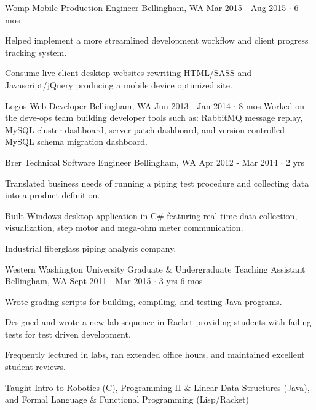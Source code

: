 \documentclass[11pt, a4paper]{awesome-cv}
\begin{document}
\begin{cventries}
  \cventry
    {Womp Mobile} %
    {Production Engineer} %
    {Bellingham, WA} %
    {Mar 2015 - Aug 2015  $\cdot$ 6 mos} %
    {
      \begin{cvitems} %
        \item Helped implement a more streamlined development workflow and client progress tracking system.
      \end{cvitems}
    }
    {Consume live client desktop websites rewriting HTML/SASS and Javascript/jQuery producing a mobile device optimized site.}

  \cventry
    {Logos} %
    {Web Developer} %
    {Bellingham, WA} %
    {Jun 2013 - Jan 2014  $\cdot$ 8 mos} %
    {
    }
    {Worked on the deve-ops team building developer tools such as: RabbitMQ message replay, MySQL cluster dashboard, server patch dashboard, and version controlled MySQL schema migration dashboard.}

  \cventry
    {Brer Technical} %
    {Software Engineer} %
    {Bellingham, WA} %
    {Apr 2012 - Mar 2014  $\cdot$ 2 yrs} %
    {
      \begin{cvitems} %
        \item Translated business needs of running a piping test procedure and collecting data into a product definition.
        \item Built Windows desktop application in C\# featuring real-time data collection, visualization, step motor and mega-ohm meter communication.
      \end{cvitems}
    }
    {Industrial fiberglass piping analysis company.}

  \cventry
    {Western Washington University} %
    {Graduate \& Undergraduate Teaching Assistant} %
    {Bellingham, WA} %
    {Sept 2011 - Mar 2015  $\cdot$ 3 yrs 6 mos} %
    {
      \begin{cvitems} %
        \item Wrote grading scripts for building, compiling, and testing Java programs.
        \item Designed and wrote a new lab sequence in Racket providing students with failing tests for test driven development.
        \item Frequently lectured in labs, ran extended office hours, and maintained excellent student reviews.
      \end{cvitems}
    }
    {Taught Intro to Robotics (C), Programming II \& Linear Data Structures (Java), and Formal Language \& Functional Programming (Lisp/Racket)}

\end{cventries}
\end{document}

